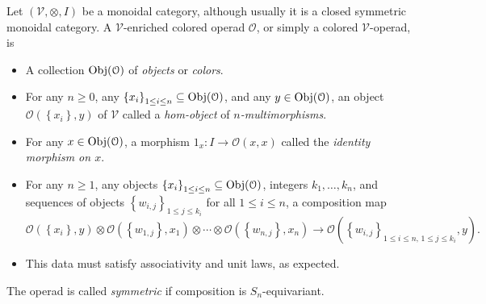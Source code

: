 \begin{definition}\label{2.3.1}
	Let $(\mathcal{V},\otimes,I) $ be a monoidal category, although usually it is a closed symmetric monoidal category. A $\mathcal{V} $-enriched colored operad $\mathcal{O} $, or simply a colored $\mathcal{V} $-operad, is
	\begin{itemize}
		\item A collection $\operatorname{Obj}(\mathcal{O} ) $ of \emph{objects} or \emph{colors}.
		\item For any $n\geq 0$, any $\left\{ x_i \right\} _{1\leq i\leq n} \subseteq \operatorname{Obj}(\mathcal{O} ) $, and any $y\in \operatorname{Obj}(\mathcal{O} ) $, an object $\mathcal{O} (\left\{ x_i \right\},y)$ of $\mathcal{V} $ called a \emph{hom-object} of \emph{$n$-multimorphisms}.
		\item For any $x\in \operatorname{Obj}(\mathcal{O} ) $, a morphism $1_x : I \to \mathcal{O} (x,x)$ called the \emph{identity morphism on $x$}.
		\item For any $n\geq 1$, any objects $\left\{ x_i \right\} _{1\leq i\leq n} \subseteq \operatorname{Obj}(\mathcal{O} ) $, integers $k_1, \ldots , k_n$, and sequences of objects $\left\{ w_{i,j}\right\}_{1\leq j\leq k_i} $ for all $1\leq i\leq n$, a composition map
			\[
				\mathcal{O} (\left\{ x_i \right\} ,y) \otimes \mathcal{O} (\left\{ w_{1,j}  \right\} ,x_1) \otimes \cdots \otimes \mathcal{O} (\left\{ w_{n,j} \right\} ,x_n)\to \mathcal{O} (\left\{ w_{i,j} \right\}_{1\leq i\leq n,\,1\leq j\leq k_i}, y)
			.\]
		\item This data must satisfy associativity and unit laws, as expected.
	\end{itemize}
	The operad is called \emph{symmetric} if composition is $S_n$-equivariant.
\end{definition}


